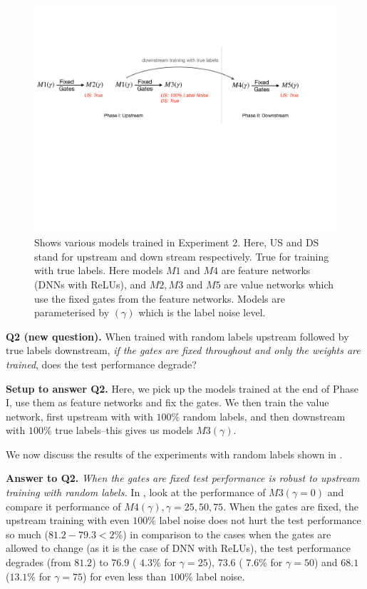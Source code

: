 \begin{figure}[h]
\centering
\includegraphics[scale=0.3]{figs/rand-label-big.pdf}
\caption{Shows various models trained in Experiment 2. Here, US and DS stand for upstream and down stream respectively. True for training with true labels. Here models $M1$ and $M4$ are feature networks (DNNs with ReLUs), and $M2, M3$ and $M5$ are value networks which use the fixed gates from the feature networks. Models are parameterised by $(\gamma)$ which is the label noise level.}
\label{fig:rand-label-setup}
\end{figure}


\textbf{Q2 (new question).} {When trained with random labels upstream followed by true labels downstream, \emph{if the gates are fixed throughout and only the weights are trained}, does the test performance degrade?}

\textbf{Setup to answer Q2.} Here, we pick up the models trained at the end of Phase I, use them as feature networks and fix the gates. We then train the value network, first upstream with with $100\%$ random labels, and then downstream with $100\%$ true labels--this gives us models $M3(\gamma)$.

We now discuss the results of the experiments with random labels shown in .

\textbf{Answer to Q2.} \emph{When the gates are fixed test performance is robust to upstream training with random labels.} In  , look at the performance of $M3(\gamma=0)$ and compare it performance of  $M4(\gamma), \gamma=25,50,75$. When the gates are fixed, the upstream training with even $100\%$ label noise does not hurt the test performance so much ($81.2-79.3 <2\%$) in comparison to the cases when the gates are allowed to change (as it is the case of DNN with ReLUs), the test performance degrades (from $81.2$) to $76.9$ ( $ 4.3\%$ for $\gamma=25$), $73.6$ ( $7.6\%$ for $\gamma=50$) and  $68.1$ ($13.1\%$ for $\gamma=75$) for even less than $100\%$ label noise.



